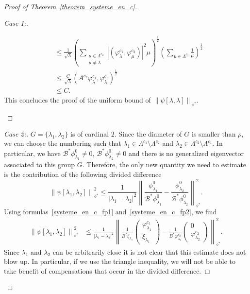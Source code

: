 \documentclass[AHL,Unicode,longabstracts]{cedram}
\newenvironment{step}[1]{\begin{proof}[#1]}{\let\qed\relax\end{proof}}
\newcommand{\fprop}[2]{\varphi^{#1}_{#2}}
\newcommand\Bs{\mathcal{B}^*}
\newcommand{\normeXalphas}[1]{\left\| #1 \right\|_{\diamond^*}}
\begin{document}
\begin{proof}[Proof of Theorem~\ref{theorem_systeme_en_c}]
\begin{step}{Case 1:}
\begin{itemize}
\begin{align*}
& \leq \frac{1}{\sqrt{\lambda}} \left(\sum_{\substack{\mu\in \Lambda^{c_2}\\ \mu \neq \lambda}} |(\fprop{c_1}{\lambda},\fprop{c_2}{\mu})|^2 \mu \right)^{\frac{1}{2}} \left(\sum_{\mu\in \Lambda^{c_2}} \frac{1}{\mu}\right)^{\frac{1}{2}} \\
& \leq \frac{C}{\sqrt{\lambda}} (A^{c_2}\fprop{c_1}{\lambda},\fprop{c_1}{\lambda})^{\frac{1}{2}} \\
& \leq C.
\end{align*}
This concludes the proof of the uniform bound of $\normeXalphas{\psi[\lambda,\lambda]}$.
\end{itemize}


\end{step}


\begin{step}{Case 2:}
$G=\{\lambda_1,\lambda_2\}$ is of cardinal $2$. Since the diameter of $G$ is smaller than $\rho$, we can choose the numbering such that $\lambda_1\in \Lambda^{c_1}\setminus \Lambda^{c_2}$ and $\lambda_2\in \Lambda^{c_2}\setminus\Lambda^{c_1}$. In particular, we have $\Bs \phi_{\lambda_1}^0\neq 0$, $\Bs\phi_{\lambda_2}^0 \neq 0$ and there is no generalized eigenvector associated to this group $G$. Therefore, the only new quantity we need to estimate is the contribution of the following divided difference
\[
\normeXalphas{\psi[\lambda_1,\lambda_2]}^2 \leq \frac{1}{|\lambda_1-\lambda_2|^2} \normeXalphas{\frac{\phi_{\lambda_1}^0}{\Bs \phi_{\lambda_1}^0} -\frac{\phi_{\lambda_2}^0}{\Bs \phi_{\lambda_2}^0} }^2.
\]
Using formulas~\eqref{systeme_en_c_fp1} and~\eqref{systeme_en_c_fp2}, we find
\begin{align*}
\normeXalphas{\psi[\lambda_1,\lambda_2]}^2 & \leq \frac{1}{|\lambda_1-\lambda_2|^2} \normeXalphas{ \frac{1}{B^* \xi_{\lambda_1}}
\begin{pmatrix} \fprop{c_1}{\lambda_1}\\ \xi_{\lambda_1}
\end{pmatrix} - \frac{1}{B^*\fprop{c_2}{\lambda_2}}
\begin{pmatrix} 0 \\ \fprop{c_2}{\lambda_2}
\end{pmatrix} }^2.
\end{align*}
Since $\lambda_1$ and $\lambda_2$ can be arbitrarily close it is not clear that this estimate does not blow up. In particular, if we use the triangle inequality, we will not be able to take benefit of compensations that occur in the divided difference.


\end{step}
\end{proof}
\end{document}

